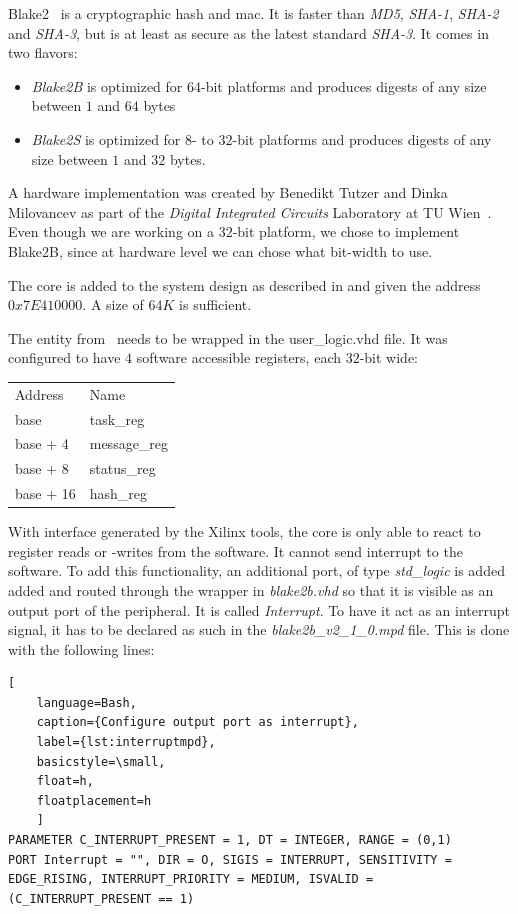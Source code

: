Blake2~\cite{blake2} is a cryptographic hash and \gls{mac}. It is faster than
\emph{MD5}, \emph{SHA-1}, \emph{SHA-2} and \emph{SHA-3}, but is at least as
secure as the latest standard \emph{SHA-3}.
It comes in two flavors:
\begin{itemize}
	\item \emph{Blake2B} is optimized for $64$-bit platforms and produces
		digests of any size between $1$ and $64$ bytes
	\item \emph{Blake2S} is optimized for $8$- to $32$-bit platforms and
		produces digests of any size between $1$ and $32$ bytes.
\end{itemize}

A hardware implementation was created by Benedikt Tutzer and Dinka Milovancev as
part of the \emph{Digital Integrated Circuits} Laboratory at TU
Wien~\cite{blake2hardware}.
Even though we are working on a $32$-bit platform, we chose to implement
Blake2B, since at hardware level we can chose what bit-width to use.

The core is added to the system design as described in
 and given the address $0x7E410000$. A size of
$64K$ is sufficient.

The entity from~\cite{blake2hardware} needs to be wrapped in the user\_logic.vhd
file.
It was configured to have $4$ software accessible registers, each $32$-bit wide:

\begin{tabular}{ll}
	Address & Name \\
	base     & task\_reg\\
	base + 4 & message\_reg\\
	base + 8 & status\_reg\\
	base + 16 & hash\_reg\\
\end{tabular}

With interface generated by the Xilinx tools, the core is only able to react to
register reads or -writes from the software.
It cannot send interrupt to the software.
To add this functionality, an additional port, of type \emph{std\_logic} is
added added and routed through the wrapper in \emph{blake2b.vhd} so that it is
visible as an output port of the peripheral.
It is called \emph{Interrupt}.
To have it act as an interrupt signal, it has to be declared as such in the
\emph{blake2b\_v2\_1\_0.mpd} file.
This is done with the following lines:

\begin{lstlisting}[
	language=Bash,
	caption={Configure output port as interrupt},
	label={lst:interruptmpd},
	basicstyle=\small,
	float=h,
	floatplacement=h
	]
PARAMETER C_INTERRUPT_PRESENT = 1, DT = INTEGER, RANGE = (0,1)
PORT Interrupt = "", DIR = O, SIGIS = INTERRUPT, SENSITIVITY = EDGE_RISING, INTERRUPT_PRIORITY = MEDIUM, ISVALID = (C_INTERRUPT_PRESENT == 1)
\end{lstlisting}

